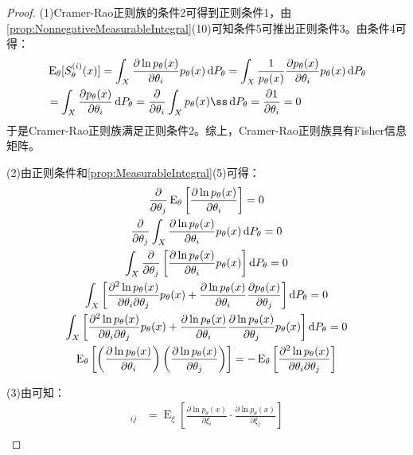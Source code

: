 \begin{proof}
	(1)Cramer-Rao正则族的条件2可得到正则条件1，由\cref{prop:NonnegativeMeasurableIntegral}(10)可知条件5可推出正则条件3。由条件4可得：
	\begin{align*}
		&\operatorname{E}_{\theta}[S_{\theta}^{(i)}(x)]=\int_{X}\frac{\partial\ln p_{\theta}(x)}{\partial\theta_i}p_{\theta}(x)\dif P_{\theta}=\int_{X}\frac{1}{p_{\theta}(x)}\frac{\partial p_{\theta}(x)}{\partial\theta_i}p_{\theta}(x)\dif P_{\theta} \\
		&=\int_{X}\frac{\partial p_{\theta}(x)}{\partial\theta_i}\dif P_{\theta}=\frac{\partial}{\partial\theta_i}\int_{X}p_{\theta}(x)ß\dif P_{\theta}=\frac{\partial1}{\partial\theta_i}=0
	\end{align*}
	于是Cramer-Rao正则族满足正则条件2。综上，Cramer-Rao正则族具有Fisher信息矩阵。\par
	(2)由正则条件和\cref{prop:MeasurableIntegral}(5)可得：
	\begin{gather*}
		\frac{\partial}{\partial\theta_j}\operatorname{E}_{\theta}\left[\frac{\partial\ln p_{\theta}(x)}{\partial\theta_i}\right]=0 \\
		\frac{\partial}{\partial\theta_j}\int_{X}\frac{\partial\ln p_{\theta}(x)}{\partial\theta_i}p_{\theta}(x)\mathop{}\!\mathrm{d} P_{\theta}=0 \\
		\int_{X}\frac{\partial}{\partial\theta_j}\left[\frac{\partial\ln p_{\theta}(x)}{\partial\theta_i}p_{\theta}(x)\right]\mathop{}\!\mathrm{d} P_{\theta}=0 \\
		\int_{X}\left[\frac{\partial^2\ln p_{\theta}(x)}{\partial\theta_i\partial\theta_j}p_{\theta}(x)+\frac{\partial\ln p_{\theta}(x)}{\partial\theta_i}\frac{\partial p_{\theta}(x)}{\partial\theta_j}\right]\mathop{}\!\mathrm{d} P_{\theta}=0 \\
		\int_{X}\left[\frac{\partial^2\ln p_{\theta}(x)}{\partial\theta_i\partial\theta_j}p_{\theta}(x)+\frac{\partial\ln p_{\theta}(x)}{\partial\theta_i}\frac{\partial \ln p_{\theta}(x)}{\partial\theta_j}p_{\theta}(x)\right]\mathop{}\!\mathrm{d} P_{\theta}=0 \\
		\operatorname{E}_{\theta}\left[\left(\frac{\partial\ln p_{\theta}(x)}{\partial\theta_i}\right)\left(\frac{\partial\ln p_{\theta}(x)}{\partial\theta_j}\right)\right]=-\operatorname{E}_{\theta}\left[\frac{\partial^2\ln p_{\theta}(x)}{\partial\theta_i\partial\theta_j}\right]
	\end{gather*}\par
	(3)由可知：
	\begin{align*}
		[i(\xi)]_{ij}&=\operatorname{E}_{\xi}\left[\frac{\partial\ln p_{\theta}(x)}{\partial\xi_i}\cdot\frac{\partial\ln p_{\theta}(x)}{\partial\xi_j}\right] \\

\end{align*}
\end{proof}
